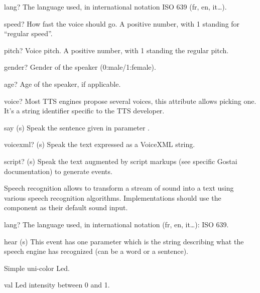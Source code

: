 \begin{urbiscriptapi}
\item[lang?] The language used, in international notation ISO 639 (fr, en,
  it\ldots).

\item[speed?] How fast the voice should go.  A positive number, with 1
  standing for ``regular speed''.

\item[pitch?] Voice pitch.  A positive number, with 1 standing the regular
  pitch.

\item[gender?] Gender of the speaker (0:male/1:female).

\item[age?] Age of the speaker, if applicable.

\item[voice?] Most TTS engines propose several voices, this attribute allows
  picking one. It's a string identifier specific to the TTS developer.

\item[say](s) Speak the sentence given in parameter .

\item[voicexml?](s) Speak the text  expressed as a VoiceXML string.

\item[script?](s) Speak the text  augmented by script markups (see
  specific Gostai documentation) to generate \urbi events.
\end{urbiscriptapi}



Speech recognition allows to transform a stream of sound into a text
using various speech recognition algorithms. Implementations
should use the  component as their default sound input.

\begin{urbiscriptapi}
\item[lang?]  The language used, in international notation (fr, en, it…):
  ISO 639.
\item[hear](s) This event has one parameter which is the string describing
  what the speech engine has recognized (can be a word or a sentence).
\end{urbiscriptapi}


Simple uni-color Led.

\begin{urbiscriptapi}
\item[val] Led intensity between 0 and 1.
\end{urbiscriptapi}



